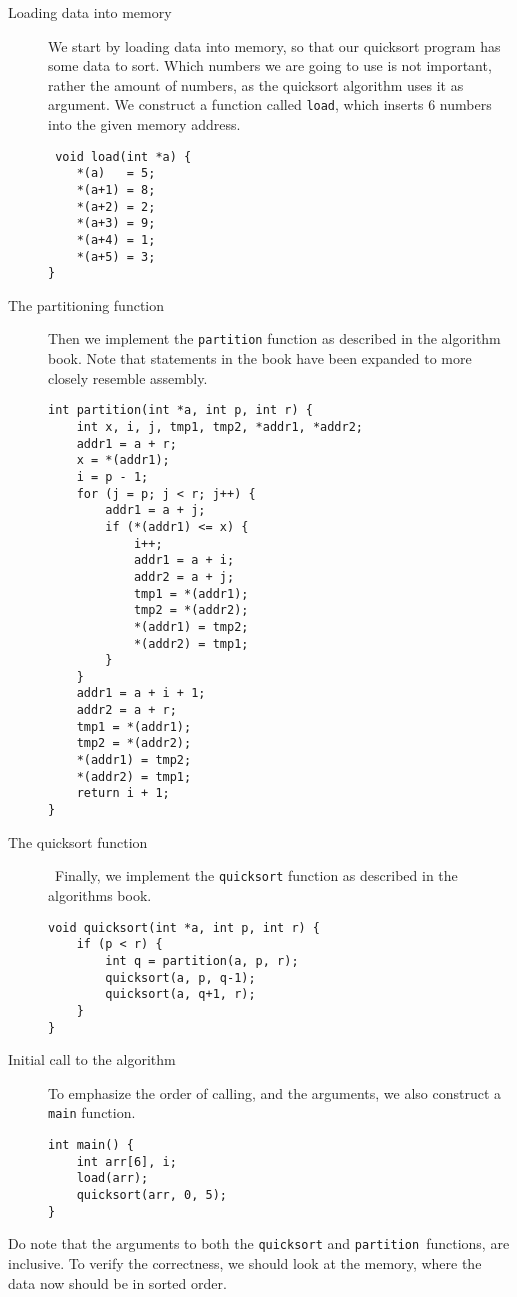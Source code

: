\begin{description}
    \item[Loading data into memory] We start by loading data into memory, so
        that our quicksort program has some data to sort. Which numbers we are
        going to use is not important, rather the amount of numbers, as the
        quicksort algorithm uses it as argument. We construct a function
        called \texttt{load}, which inserts 6 numbers into the given memory
        address.
        \begin{lstlisting}
 void load(int *a) {
    *(a)   = 5;
    *(a+1) = 8;
    *(a+2) = 2;
    *(a+3) = 9;
    *(a+4) = 1;
    *(a+5) = 3;
}\end{lstlisting}

    \item[The partitioning function] Then we implement the \texttt{partition}
        function as described in the algorithm book\cite{ref:alg}. Note that
        statements in the book have been expanded to more closely resemble
        assembly.
\begin{lstlisting}
int partition(int *a, int p, int r) {
    int x, i, j, tmp1, tmp2, *addr1, *addr2;
    addr1 = a + r;
    x = *(addr1);
    i = p - 1;
    for (j = p; j < r; j++) {
        addr1 = a + j;
        if (*(addr1) <= x) {
            i++;
            addr1 = a + i;
            addr2 = a + j;
            tmp1 = *(addr1);
            tmp2 = *(addr2);
            *(addr1) = tmp2;
            *(addr2) = tmp1;
        }
    }
    addr1 = a + i + 1;
    addr2 = a + r;
    tmp1 = *(addr1);
    tmp2 = *(addr2);
    *(addr1) = tmp2;
    *(addr2) = tmp1;
    return i + 1;
}
\end{lstlisting}

    \item[The quicksort function] Finally, we implement the
        \texttt{quicksort} function as described in the algorithms book.
\begin{lstlisting}
void quicksort(int *a, int p, int r) {
    if (p < r) {
        int q = partition(a, p, r);
        quicksort(a, p, q-1);
        quicksort(a, q+1, r);
    }
}
\end{lstlisting}

    \item[Initial call to the algorithm] To emphasize the order of calling, and
        the arguments, we also construct a \texttt{main} function.
\begin{lstlisting}
int main() {
    int arr[6], i;
    load(arr);
    quicksort(arr, 0, 5);
}
\end{lstlisting}
\end{description}
Do note that the arguments to both the \texttt{quicksort} and
\texttt{partition} functions, are inclusive. To verify the correctness, we
should look at the memory, where the data now should be in sorted order.


